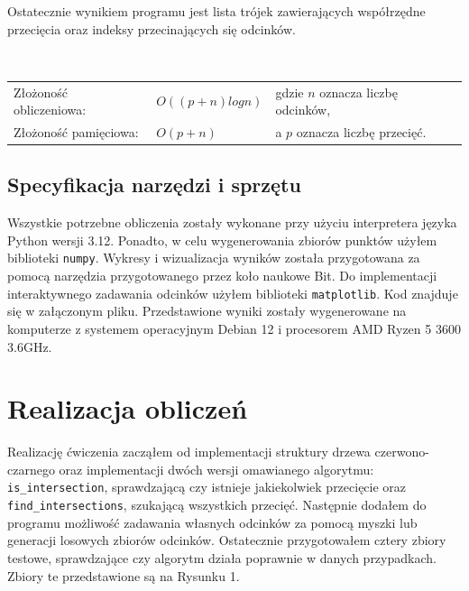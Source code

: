 \documentclass[11pt,a4paper]{article}
\begin{document}
Ostatecznie wynikiem programu jest lista trójek zawierających
współrzędne przecięcia oraz indeksy przecinających się odcinków.

~

\begin{tabular}{l|l|l}
    Złożoność obliczeniowa: & $O((p + n)logn)$ & \footnotesize gdzie $n$ oznacza liczbę odcinków,\\
    Złożoność pamięciowa: & $O(p + n)$ & \footnotesize a $p$ oznacza liczbę przecięć.\\
\end{tabular}  

\subsection{Specyfikacja narzędzi i sprzętu}
Wszystkie potrzebne obliczenia zostały wykonane przy użyciu interpretera języka Python wersji 3.12.
Ponadto, w celu wygenerowania zbiorów punktów użyłem biblioteki \verb|numpy|. 
Wykresy i wizualizacja wyników została przygotowana za pomocą narzędzia
przygotowanego przez koło naukowe Bit. Do implementacji interaktywnego
zadawania odcinków użyłem biblioteki \verb|matplotlib|. Kod znajduje się w załączonym pliku.
Przedstawione wyniki zostały wygenerowane na komputerze z systemem operacyjnym Debian 12 i 
procesorem AMD Ryzen 5 3600 3.6GHz.

\section{Realizacja obliczeń}
Realizację ćwiczenia zacząłem od implementacji struktury drzewa 
czerwono-czarnego oraz implementacji dwóch wersji 
omawianego algorytmu: \verb|is_intersection|, sprawdzającą czy 
istnieje jakiekolwiek przecięcie oraz \verb|find_intersections|,
szukającą wszystkich przecięć. 
Następnie dodałem do programu możliwość zadawania własnych 
odcinków za pomocą myszki lub generacji losowych zbiorów odcinków.
Ostatecznie przygotowałem cztery zbiory testowe, sprawdzające czy
algorytm działa poprawnie w danych przypadkach. Zbiory te przedstawione
są na Rysunku 1.
\end{document}

